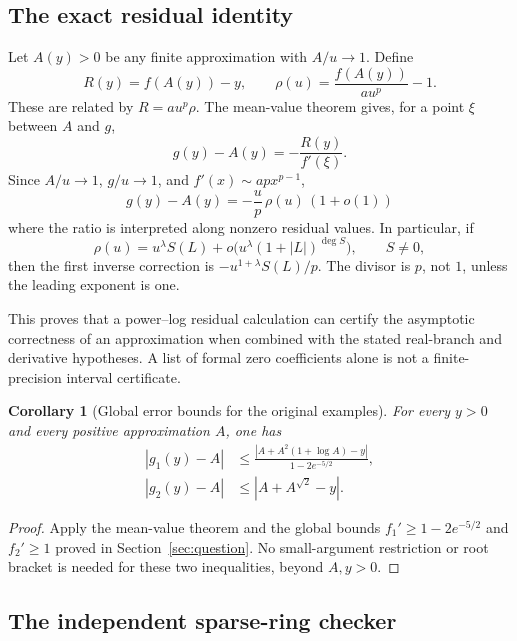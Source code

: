 \documentclass[11pt,a4paper]{article}
\numberwithin{equation}{section}
\newtheorem{corollary}[theorem]{Corollary}
\theoremstyle{definition}
\theoremstyle{remark}
\begin{document}
\subsection{The exact residual identity}

Let $A(y)>0$ be any finite approximation with $A/u\to1$. Define
\[
 R(y)=f(A(y))-y,\qquad
 \rho(u)=\frac{f(A(y))}{a u^p}-1.
\]
These are related by $R=a u^p\rho$. The mean-value theorem gives, for a
point $\xi$ between $A$ and $g$,
\begin{equation}\label{eq:residualtransfer}
 g(y)-A(y)=-\frac{R(y)}{f'(\xi)}.
\end{equation}
Since $A/u\to1$, $g/u\to1$, and $f'(x)\sim apx^{p-1}$,
\begin{equation}\label{eq:relative-transfer}
 g(y)-A(y)=-\frac up\,\rho(u)\,(1+o(1))
\end{equation}
where the ratio is interpreted along nonzero residual values. In
particular, if
\[
 \rho(u)=u^\lambda S(L)+o\bigl(u^\lambda(1+|L|)^{\deg S}\bigr),
 \qquad S\ne0,
\]
then the first inverse correction is $-u^{1+\lambda}S(L)/p$.
The divisor is $p$, not $1$, unless the leading exponent is one.

This proves that a power--log residual calculation can certify the
asymptotic correctness of an approximation when combined with the stated
real-branch and derivative hypotheses. A list of formal zero coefficients
alone is not a finite-precision interval certificate.

\begin{corollary}[Global error bounds for the original examples]
For every $y>0$ and every positive approximation $A$, one has
\begin{align*}
 |g_1(y)-A|&\le
 \frac{|A+A^2(1+\log A)-y|}{1-2e^{-5/2}},\\
 |g_2(y)-A|&\le |A+A^{\sqrt2}-y|.
\end{align*}
\end{corollary}
\begin{proof}
Apply the mean-value theorem and the global bounds
$f_1'\ge1-2e^{-5/2}$ and $f_2'\ge1$ proved in
Section~\ref{sec:question}. No small-argument restriction or root bracket
is needed for these two inequalities, beyond $A,y>0$.
\end{proof}

\subsection{The independent sparse-ring checker}
\end{document}

